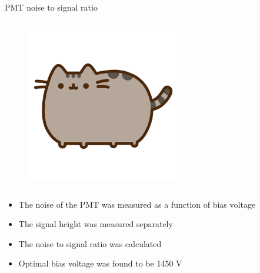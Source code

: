 \begin{columnframe}{PMT noise to signal ratio}
    \begin{column}{0.5\textwidth}
        \begin{figure}
            \centering
            \includegraphics[width=0.6\textwidth, frame]{images/pusheen.png}
        \end{figure}
    \end{column}
    \begin{column}{0.5\textwidth}
        \begin{itemize}
            \item The noise of the PMT was measured as a function of bias voltage
            \item The signal height was measured separately
            \item The noise to signal ratio was calculated
            \item Optimal bias voltage was found to be 1450 \si{\volt}
        \end{itemize}
    \end{column}
\end{columnframe}

